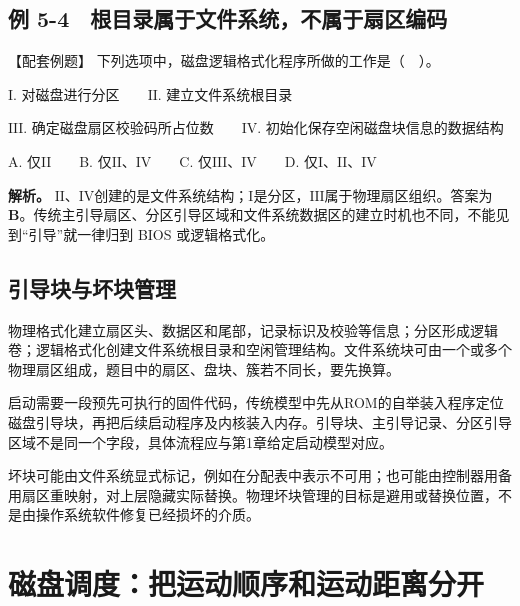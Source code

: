 \subsection{例 5-4　根目录属于文件系统，不属于扇区编码}\label{OS05-ex7-4}

\begin{example}[配套例题]

【配套例题】 下列选项中，磁盘逻辑格式化程序所做的工作是（　）。

\ensuremath{\mathrm{I}}. 对磁盘进行分区　　\ensuremath{\mathrm{II}}. 建立文件系统根目录

\ensuremath{\mathrm{III}}. 确定磁盘扇区校验码所占位数　　\ensuremath{\mathrm{IV}}. 初始化保存空闲磁盘块信息的数据结构

A. 仅\ensuremath{\mathrm{II}}　　B. 仅\ensuremath{\mathrm{II}}、\ensuremath{\mathrm{IV}}　　C. 仅\ensuremath{\mathrm{III}}、\ensuremath{\mathrm{IV}}　　D. 仅\ensuremath{\mathrm{I}}、\ensuremath{\mathrm{II}}、\ensuremath{\mathrm{IV}}

\end{example}

\textbf{解析。} \ensuremath{\mathrm{II}}、\ensuremath{\mathrm{IV}}创建的是文件系统结构；\ensuremath{\mathrm{I}}是分区，\ensuremath{\mathrm{III}}属于物理扇区组织。答案为 \textbf{B}。传统主引导扇区、分区引导区域和文件系统数据区的建立时机也不同，不能见到``引导''就一律归到 BIOS 或逻辑格式化。

\subsection{引导块与坏块管理}\label{OS05-boot-badblocks}

物理格式化建立扇区头、数据区和尾部，记录标识及校验等信息；分区形成逻辑卷；逻辑格式化创建文件系统根目录和空闲管理结构。文件系统块可由一个或多个物理扇区组成，题目中的扇区、盘块、簇若不同长，要先换算。

启动需要一段预先可执行的固件代码，传统模型中先从ROM的自举装入程序定位磁盘引导块，再把后续启动程序及内核装入内存。引导块、主引导记录、分区引导区域不是同一个字段，具体流程应与第1章给定启动模型对应。

坏块可能由文件系统显式标记，例如在分配表中表示不可用；也可能由控制器用备用扇区重映射，对上层隐藏实际替换。物理坏块管理的目标是避用或替换位置，不是由操作系统软件修复已经损坏的介质。

\section{磁盘调度：把运动顺序和运动距离分开}\label{OS05-7-9}

